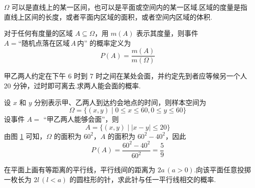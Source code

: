 \begin{note}
    \indent $\varOmega$ 可以是直线上的某一区间，也可以是平面或空间内的某一区域.区域的度量是指直线上区间的长度，或者平面内区域的面积，或者空间内区域的体积.
\end{note}

对于任何有度量的区域 $A \subseteq \varOmega$，用 $m(A)$ 表示其度量，则事件 $A = \text{“随机点落在区域}\, A \,\text{内”}$ 的概率定义为
$$
P(A)=\dfrac{m(A)}{m(\varOmega)}
$$

\begin{example}[][会面问题]
    \indent 甲乙两人约定在下午 6 时到 7 时之间在某处会面，并约定先到者应等候另一个人 20 分钟，过时即可离去.求两人能会面的概率.
\end{example}

\begin{solution}
    设 $x$ 和 $y$ 分别表示甲、乙两人到达约会地点的时间，则样本空间为
    $$
    \varOmega = \{ (x,y) \mid 0 \leqslant x \leqslant 60, 0 \leqslant y \leqslant 60 \}
    $$
    设事件 $A=$ “甲乙两人能够会面”，则
    $$
    A = \{ (x,y) \mid |x-y| \leqslant 20 \}
    $$
    由图 \ref{fig:会面问题} 可知，$\varOmega$ 的面积为 $60^2$，$A$ 的面积为 $60^2 - 40^2$，因此
    $$
    P(A) = \dfrac{60^2 - 40^2}{60^2} = \dfrac{5}{9}
    $$

    \begin{figure}[H]
        \centering


        \caption{}
        \label{fig:会面问题}
    \end{figure}
\end{solution}

\begin{example}[][蒲丰投针问题]
    \indent 在平面上画有等距离的平行线，平行线间的距离为 $2a \, (a>0)$.向该平面任意投掷一枚长为 $2l \, (l<a)$ 的圆柱形的针，求此针与任一平行线相交的概率.
\end{example}

